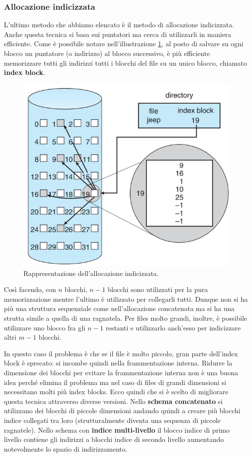 % 
\subsubsection{Allocazione indicizzata}
L'ultimo metodo che abbiamo elencato è il metodo di allocazione indicizzata. Anche questa tecnica si basa sui puntatori ma cerca di utilizzarli in maniera efficiente. Come è possibile notare nell'illustrazione \ref{fig:allocazione indicizzata}, al posto di salvare su ogni blocco un puntatore (o indirizzo) al blocco successivo, è più efficiente memorizzare tutti gli indirizzi tutti i blocchi del file su un unico blocco, chiamato \textbf{index block}.
\begin{figure}[h]
    \centering
    \includegraphics[width = .6\textwidth]{../res/imgs/file system implementation/allocazione indicizzata.png}
    \caption{Rappresentazione dell'allocazione indicizzata.}
    \label{fig:allocazione indicizzata}
\end{figure}
Così facendo, con $n$ blocchi, $n - 1$ blocchi sono utilizzati per la pura memorizzazione mentre l'ultimo è utilizzato per collegarli tutti. Dunque non si ha più una struttura sequenziale come nell'allocazione concatenata ma si ha una strutta simile a quella di una ragnatela. Per files molto grandi, inoltre, è possibile utilizzare uno blocco fra gli $n - 1$ restanti e utilizzarlo anch'esso per indicizzare altri $m - 1$ blocchi.

In questo caso il problema è che se il file è molto piccolo, gran parte dell'index block è sprecato: si incombe quindi nella frammentazione interna. Ridurre la dimensione dei blocchi per evitare la frammentazione interna non è una buona idea perché elimina il problema ma nel caso di files di grandi dimensioni si necessitano molti più index blocks. Ecco quindi che si è scelto di migliorare questa tecnica attraverso diverse versioni. Nello \textbf{schema concatenato} si utilizzano dei blocchi di piccole dimensioni andando quindi a creare più blocchi indice collegati tra loro (strutturalmente diventa una sequenza di piccole ragnatele). Nello schema con \textbf{indice multi-livello} il blocco indice di primo livello contiene gli indirizzi a blocchi indice di secondo livello aumentando notevolmente lo spazio di indirizzamento.

